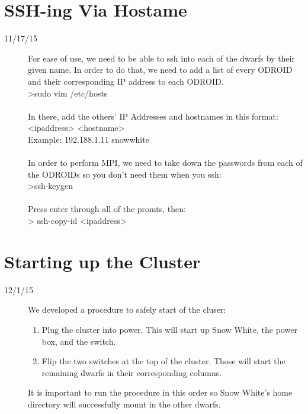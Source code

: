 \section{SSH-ing Via Hostame}
\begin{description}
\item [11/17/15] For ease of use, we need to be able to ssh into each of the dwarfs by their given name. In order to do that, we need to add a list of every ODROID and their corresponding IP address to each ODROID. \\
>sudo vim /etc/hosts \\ \\
In there, add the others' IP Addresses and hostnames in this format: \\
<ipaddress> <hostname> \\
Example: 192.188.1.11 snowwhite \\ \\
In order to perform MPI, we need to take down the passwords from each of the ODROIDs so you don't need them when you ssh: \\
>ssh-keygen \\ \\
Press enter through all of the promts, then: \\
> ssh-copy-id <ipaddress>
\end{description}

\section{Starting up the Cluster}
\begin{description}
\item [12/1/15] We developed a procedure to safely start of the cluser:
\begin{enumerate}
	\item Plug the cluster into power. This will start up Snow White, the power box, and the switch.
	\item Flip the two switches at the top of the cluster. Those will start the remaining dwarfs in their corresponding columns.
\end{enumerate}
It is important to run the procedure in this order so Snow White's home directory will successfully mount in the other dwarfs.
\end{description}


